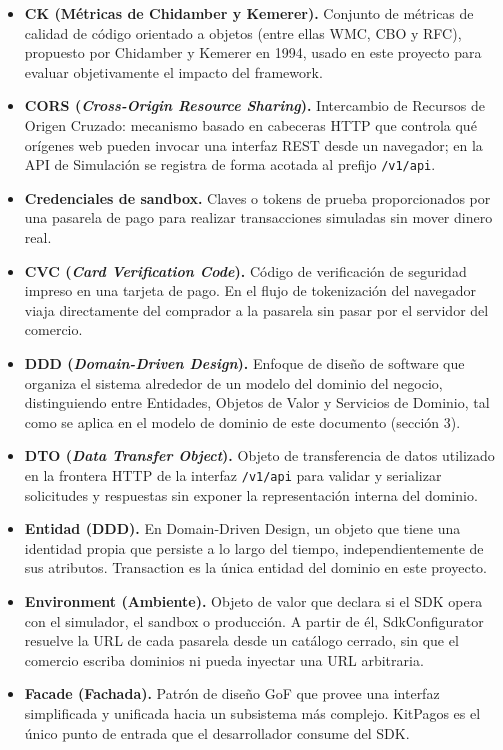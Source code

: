 \begin{itemize}
    \item \textbf{CK (Métricas de Chidamber y Kemerer).} Conjunto de métricas de calidad de código orientado a objetos (entre ellas WMC, CBO y RFC), propuesto por Chidamber y Kemerer en 1994, usado en este proyecto para evaluar objetivamente el impacto del framework.
    \item \textbf{CORS (\textit{Cross-Origin Resource Sharing}).} Intercambio de Recursos de Origen Cruzado: mecanismo basado en cabeceras HTTP que controla qué orígenes web pueden invocar una interfaz REST desde un navegador; en la API de Simulación se registra de forma acotada al prefijo \texttt{/v1/api}.
    \item \textbf{Credenciales de sandbox.} Claves o tokens de prueba proporcionados por una pasarela de pago para realizar transacciones simuladas sin mover dinero real.
    \item \textbf{CVC (\textit{Card Verification Code}).} Código de verificación de seguridad impreso en una tarjeta de pago. En el flujo de tokenización del navegador viaja directamente del comprador a la pasarela sin pasar por el servidor del comercio.
    \item \textbf{DDD (\textit{Domain-Driven Design}).} Enfoque de diseño de software que organiza el sistema alrededor de un modelo del dominio del negocio, distinguiendo entre Entidades, Objetos de Valor y Servicios de Dominio, tal como se aplica en el modelo de dominio de este documento (sección 3).
    \item \textbf{DTO (\textit{Data Transfer Object}).} Objeto de transferencia de datos utilizado en la frontera HTTP de la interfaz \texttt{/v1/api} para validar y serializar solicitudes y respuestas sin exponer la representación interna del dominio.
    \item \textbf{Entidad (DDD).} En Domain-Driven Design, un objeto que tiene una identidad propia que persiste a lo largo del tiempo, independientemente de sus atributos. Transaction es la única entidad del dominio en este proyecto.
    \item \textbf{Environment (Ambiente).} Objeto de valor que declara si el SDK opera con el simulador, el sandbox o producción. A partir de él, SdkConfigurator resuelve la URL de cada pasarela desde un catálogo cerrado, sin que el comercio escriba dominios ni pueda inyectar una URL arbitraria.
    \item \textbf{Facade (Fachada).} Patrón de diseño GoF que provee una interfaz simplificada y unificada hacia un subsistema más complejo. KitPagos es el único punto de entrada que el desarrollador consume del SDK.

\end{itemize}
